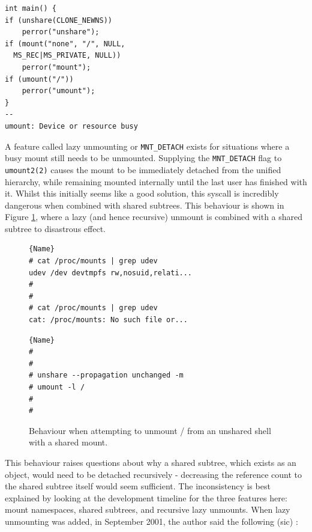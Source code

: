 \documentclass[12pt,a4paper,twoside]{report}
\begin{document}
\begin{lstlisting}[float,label={lst:unshare-umount}]
int main() {
if (unshare(CLONE_NEWNS))
	perror("unshare");
if (mount("none", "/", NULL,
  MS_REC|MS_PRIVATE, NULL))
	perror("mount");
if (umount("/"))
	perror("umount");
}
--
umount: Device or resource busy
\end{lstlisting}

A feature called lazy unmounting or \texttt{MNT\_DETACH} exists for situations where a busy mount still needs to be unmounted. Supplying the \texttt{MNT\_DETACH} flag to \texttt{umount2(2)} causes the mount to be immediately detached from the unified hierarchy, while remaining mounted internally until the last user has finished with it. Whilst this initially seems like a good solution, this syscall is incredibly dangerous when combined with shared subtrees. This behaviour is shown in Figure \ref{fig:unshare-umount-lazy}, where a lazy (and hence recursive) unmount is combined with a shared subtree to disastrous effect.

\begin{figure}
\begin{minipage}{.45\textwidth}

\begin{lstlisting}[frame=tlrb,showlines=true]{Name}
# cat /proc/mounts | grep udev
udev /dev devtmpfs rw,nosuid,relati...
#
#
# cat /proc/mounts | grep udev
cat: /proc/mounts: No such file or...
\end{lstlisting}
\end{minipage}\hfill
\begin{minipage}{.45\textwidth}

\begin{lstlisting}[frame=tlrb]{Name}
#
#
# unshare --propagation unchanged -m
# umount -l /
#
#
\end{lstlisting}

\end{minipage}

\caption{Behaviour when attempting to unmount / from an unshared shell with a shared mount.}
\label{fig:unshare-umount-lazy}
\end{figure}

This behaviour raises questions about why a shared subtree, which exists as an object, would need to be detached recursively - decreasing the reference count to the shared subtree itself would seem sufficient. The inconsistency is best explained by looking at the development timeline for the three features here: mount namespaces, shared subtrees, and recursive lazy unmounts. When lazy unmounting was added, in September 2001, the author said the following (sic) \citep{viro_patch_2001}:
\end{document}
